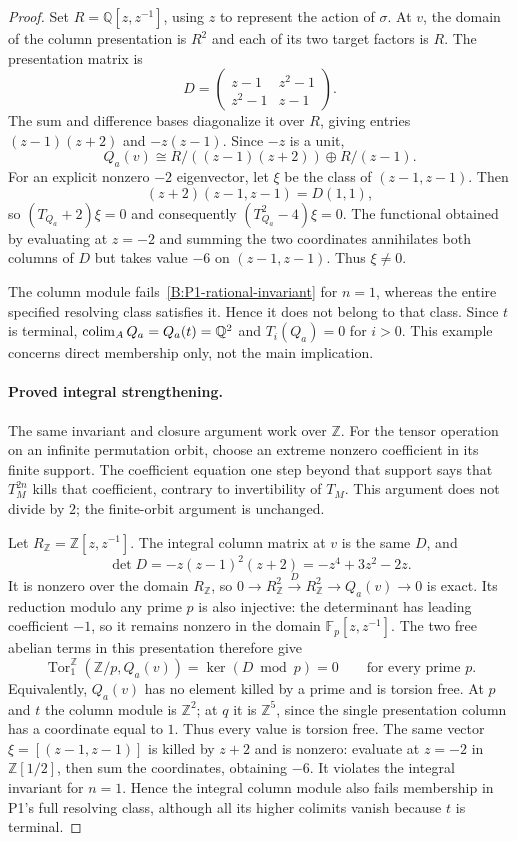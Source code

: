 \begin{proof}
Set $R=\mathbb Q[z,z^{-1}]$, using $z$ to represent the action of
$\sigma$. At $v$, the domain of the column presentation is $R^2$ and
each of its two target factors is $R$. The presentation matrix is
\[
 D=\begin{pmatrix}z-1&z^2-1\\z^2-1&z-1\end{pmatrix}.
\]
The sum and difference bases diagonalize it over $R$, giving entries
$(z-1)(z+2)$ and $-z(z-1)$. Since $-z$ is a unit,
\[
 Q_a(v)\cong R/((z-1)(z+2))\oplus R/(z-1).
\]
For an explicit nonzero $-2$ eigenvector, let
$\xi$ be the class of $(z-1,z-1)$. Then
\[
 (z+2)(z-1,z-1)=D(1,1),
\]
so $(T_{Q_a}+2)\xi=0$ and consequently
$(T_{Q_a}^2-4)\xi=0$. The functional obtained by evaluating at $z=-2$
and summing the two coordinates annihilates both columns of $D$ but
takes value $-6$ on $(z-1,z-1)$. Thus $\xi\ne0$.

The column module fails~\eqref{B:P1-rational-invariant} for $n=1$,
whereas the entire specified resolving class satisfies it. Hence it
does not belong to that class. Since $t$ is terminal,
$\operatorname*{colim}_A Q_a=Q_a(t)=\mathbb Q^2$ and $T_i(Q_a)=0$ for $i>0$.
This example concerns direct membership only, not the main implication.

\paragraph{Proved integral strengthening.}
The same invariant and closure argument work over $\mathbb Z$.
For the tensor operation on an infinite permutation orbit, choose an
extreme nonzero coefficient in its finite support. The coefficient
equation one step beyond that support says that $T_M^{2n}$ kills
that coefficient, contrary to invertibility of $T_M$. This argument
does not divide by $2$; the finite-orbit argument is unchanged.

Let $R_{\mathbb Z}=\mathbb Z[z,z^{-1}]$. The integral column matrix at
$v$ is the same $D$, and
\[
 \det D=-z(z-1)^2(z+2)=-z^4+3z^2-2z.
\]
It is nonzero over the domain $R_{\mathbb Z}$, so
$0\to R_{\mathbb Z}^2\xrightarrow{D}R_{\mathbb Z}^2
\to Q_a(v)\to0$ is exact. Its reduction modulo any prime $p$
is also injective: the determinant has leading coefficient $-1$,
so it remains nonzero in the domain $\mathbb F_p[z,z^{-1}]$.
The two free abelian terms in this presentation therefore give
\[
 \operatorname{Tor}^{\mathbb Z}_1(\mathbb Z/p,Q_a(v))
 =\ker(D\bmod p)=0
 \qquad\text{for every prime }p.
\]
Equivalently, $Q_a(v)$ has no element killed by a prime and is
torsion free. At $p$ and $t$ the column module is $\mathbb Z^2$;
at $q$ it is $\mathbb Z^5$, since the single presentation column
has a coordinate equal to $1$. Thus every value is torsion free.
The same vector $\xi=[(z-1,z-1)]$ is killed by $z+2$ and is
nonzero: evaluate at $z=-2$ in $\mathbb Z[1/2]$, then sum the
coordinates, obtaining $-6$. It violates the integral invariant
for $n=1$. Hence the integral column module also fails membership
in P1's full resolving class, although all its higher colimits
vanish because $t$ is terminal.
\end{proof}

